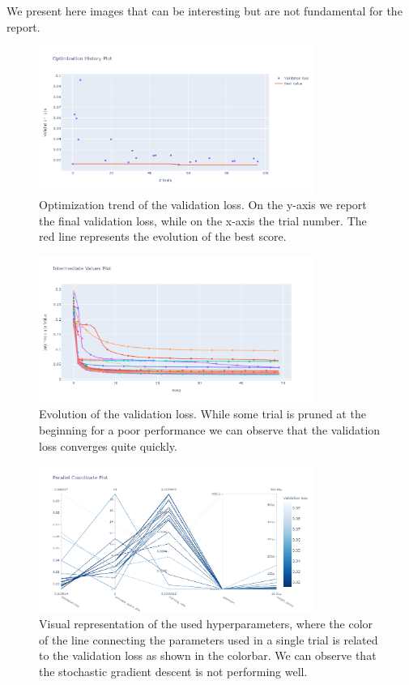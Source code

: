 We present here images that can be interesting but are not fundamental for the report.
\begin{figure}[h]
    \centering
    \includegraphics[width=0.8\textwidth]{Images/Optimization.png}
    \caption{Optimization trend of the validation loss. On the y-axis we report the final validation loss, while on the x-axis the trial number.
        The red line represents the evolution of the best score.}
    \label{fig:opt}
\end{figure}

\begin{figure}[h]
    \centering
    \includegraphics[width=0.8\textwidth]{Images/Losses.png}
    \caption{Evolution of the validation loss. While some trial is pruned at the beginning for a poor performance we can observe 
        that the validation loss converges quite quickly.}
    \label{fig:losses}
\end{figure}

\begin{figure}[h]
    \centering
    \includegraphics[width=0.8\textwidth]{Images/Hyperparams.png}
    \caption{Visual representation of the used hyperparameters, where the color of the line connecting the parameters used in a single 
    trial is related to the validation loss as shown in the colorbar. We can observe that the stochastic gradient descent is not 
    performing well.}
    \label{fig:hyper}
\end{figure}

